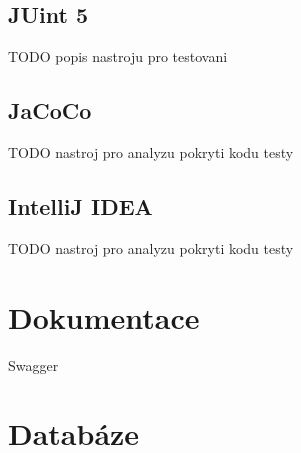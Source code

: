     \subsection{JUint 5}
    TODO popis nastroju pro testovani
    \subsection{JaCoCo}\label{resere:testovani:jacoco}
    TODO nastroj pro analyzu pokryti kodu testy \cite{JoCoCo}
    \subsection{IntelliJ IDEA}\label{resere:testovani:intellij-idea}
    TODO nastroj pro analyzu pokryti kodu testy \cite{intellij-idea-code-coverage}

\section{Dokumentace}\label{resere:dokumentace}
    Swagger
\section{Databáze}\label{resere:databaze}
